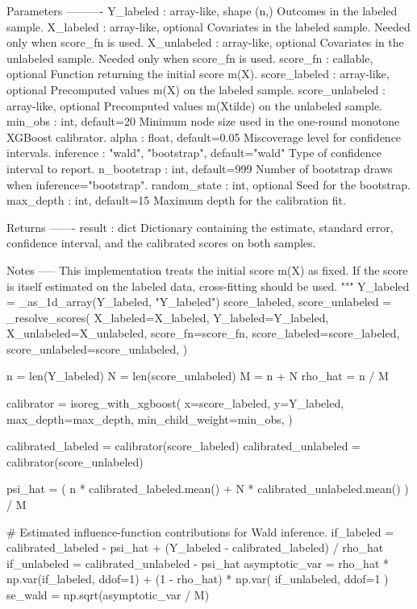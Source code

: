\documentclass{article}
\theoremstyle{plain}
\theoremstyle{definition}
\newcommand{\1}{\mathbbm{1}}
\begin{document}
\begin{codeblock}
    Parameters
    ----------
    Y_labeled : array-like, shape (n,)
        Outcomes in the labeled sample.
    X_labeled : array-like, optional
        Covariates in the labeled sample. Needed only when score_fn is used.
    X_unlabeled : array-like, optional
        Covariates in the unlabeled sample. Needed only when score_fn is used.
    score_fn : callable, optional
        Function returning the initial score m(X).
    score_labeled : array-like, optional
        Precomputed values m(X) on the labeled sample.
    score_unlabeled : array-like, optional
        Precomputed values m(Xtilde) on the unlabeled sample.
    min_obs : int, default=20
        Minimum node size used in the one-round monotone XGBoost calibrator.
    alpha : float, default=0.05
        Miscoverage level for confidence intervals.
    inference : {"wald", "bootstrap"}, default="wald"
        Type of confidence interval to report.
    n_bootstrap : int, default=999
        Number of bootstrap draws when inference="bootstrap".
    random_state : int, optional
        Seed for the bootstrap.
    max_depth : int, default=15
        Maximum depth for the calibration fit.

    Returns
    -------
    result : dict
        Dictionary containing the estimate, standard error, confidence
        interval, and the calibrated scores on both samples.

    Notes
    -----
    This implementation treats the initial score m(X) as fixed. If the score
    is itself estimated on the labeled data, cross-fitting should be used.
    """
    Y_labeled = _as_1d_array(Y_labeled, "Y_labeled")
    score_labeled, score_unlabeled = _resolve_scores(
        X_labeled=X_labeled,
        Y_labeled=Y_labeled,
        X_unlabeled=X_unlabeled,
        score_fn=score_fn,
        score_labeled=score_labeled,
        score_unlabeled=score_unlabeled,
    )

    n = len(Y_labeled)
    N = len(score_unlabeled)
    M = n + N
    rho_hat = n / M

    calibrator = isoreg_with_xgboost(
        x=score_labeled,
        y=Y_labeled,
        max_depth=max_depth,
        min_child_weight=min_obs,
    )

    calibrated_labeled = calibrator(score_labeled)
    calibrated_unlabeled = calibrator(score_unlabeled)

    psi_hat = (
        n * calibrated_labeled.mean() + N * calibrated_unlabeled.mean()
    ) / M

    # Estimated influence-function contributions for Wald inference.
    if_labeled = calibrated_labeled - psi_hat + (Y_labeled - calibrated_labeled) / rho_hat
    if_unlabeled = calibrated_unlabeled - psi_hat
    asymptotic_var = rho_hat * np.var(if_labeled, ddof=1) + (1 - rho_hat) * np.var(
        if_unlabeled, ddof=1
    )
    se_wald = np.sqrt(asymptotic_var / M)


\end{codeblock}
\end{document}
